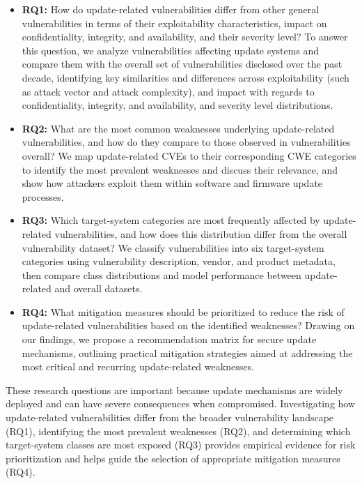 \documentclass[fleqn,s1,names,tex]{neptune}
\begin{document}
\begin{itemize}
    \item
    \textbf{RQ1:}
    How do update-related vulnerabilities differ from other general vulnerabilities in terms of their exploitability characteristics, impact on confidentiality, integrity, and availability, and their severity level?
       To answer this question, we analyze vulnerabilities affecting update systems and compare them with the overall set of vulnerabilities disclosed over the past decade, identifying key similarities and differences across exploitability (such as attack vector and attack complexity), and impact with regards to confidentiality, integrity, and availability, and severity level distributions.



   
    \item
    \textbf{RQ2:} 
    What are the most common weaknesses underlying update-related vulnerabilities, and how do they compare to those observed in vulnerabilities overall?           We map update-related CVEs to their corresponding CWE categories to identify the most prevalent weaknesses and discuss their relevance, and show how attackers exploit them within software and firmware update processes.
    

    \item
    \textbf{RQ3:}
    Which target-system categories are most frequently affected by update-related vulnerabilities, and how does this distribution differ from the overall vulnerability dataset?
    We classify vulnerabilities into six target-system categories using vulnerability description, vendor, and product metadata, then compare class distributions and model performance between update-related and overall datasets.
    

    \item
    \textbf{RQ4:} 
    What mitigation measures should be prioritized to reduce the risk of update-related vulnerabilities based on the identified weaknesses?
         Drawing on our findings, we propose a recommendation matrix for secure update mechanisms, outlining practical mitigation strategies aimed at addressing the most critical and recurring update-related weaknesses.




  
\end{itemize}



These research questions are important because update mechanisms are widely deployed and can have severe consequences when compromised. Investigating how update-related vulnerabilities differ from the broader vulnerability landscape (RQ1), identifying the most prevalent weaknesses (RQ2), and determining which target-system classes are most exposed (RQ3) provides empirical evidence for risk prioritization and helps guide the selection of appropriate mitigation measures (RQ4).
\end{document}

